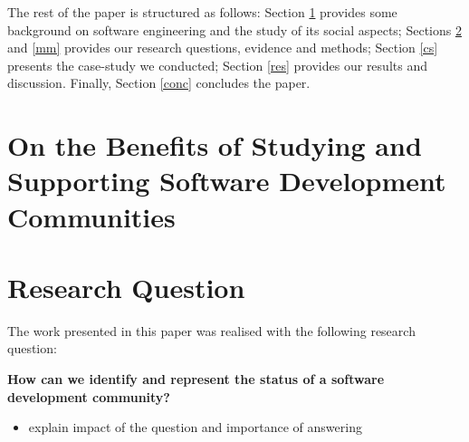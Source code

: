 \documentclass[conference]{IEEEtran}
\begin{document}
The rest of the paper is structured as follows: Section \ref{devcomm} provides some background on software engineering and the study of its social aspects; Sections \ref{rq} and \ref{mm} provides our research questions, evidence and methods; Section \ref{cs} presents the case-study we conducted; Section \ref{res} provides our results and discussion. Finally, Section \ref{conc} concludes the paper.


\section{On the Benefits of Studying and Supporting Software Development Communities}\label{devcomm}

\section{Research Question}\label{rq}

The work presented in this paper was realised with the following research question:

\begin{center}
{\bf How can we identify and represent the status of a software development community?}\\
\end{center}

\begin{itemize}
\item explain impact of the question and importance of answering
\end{itemize}
\end{document}
